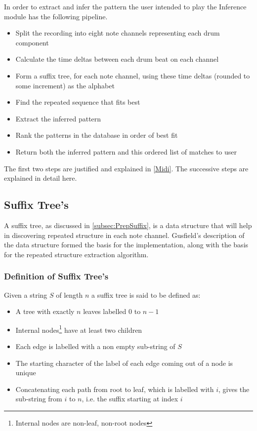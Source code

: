 \documentclass[12pt,twoside,notitlepage]{report}
\begin{document}
	In order to extract and infer the pattern the user intended to play the Inference module has the following pipeline.

	\begin{itemize}
		\item{Split the recording into eight note channels representing each drum component}
		\item{Calculate the time deltas between each drum beat on each channel}
		\item{Form a suffix tree, for each note channel, using these time deltas (rounded to some increment) as the alphabet}
		\item{Find the repeated sequence that fits best}
		\item{Extract the inferred pattern}
		\item{Rank the patterns in the database in order of best fit}
		\item{Return both the inferred pattern and this ordered list of matches to user}
	\end{itemize}
	
	The first two steps are justified and explained in \ref{Midi}. The successive steps are explained in detail here.
		\subsection{\label{subsec:SuffixTree}Suffix Tree's}
		A suffix tree, as discussed in \ref{subsec:PrepSuffix}, is a data structure that will help in discovering repeated structure in each note channel. Gusfield's\cite{Gusfield1999} description of the data structure formed the basis for the implementation, along with the basis for the repeated structure extraction algorithm.
		
			\subsubsection{Definition of Suffix Tree's}
			Given a string $S$ of length $n$ a suffix tree is said to be defined as:
			\begin{itemize}
				\item{A tree with exactly $n$ leaves labelled $0$ to $n-1$}
				\item{Internal nodes\footnote{Internal nodes are non-leaf, non-root nodes} have at least two children}
				\item{Each edge is labelled with a non empty sub-string of $S$}
				\item{The starting character of the label of each edge coming out of a node is unique}
				\item{Concatenating each path from root to leaf, which is labelled with $i$, gives the sub-string from $i$ to $n$, i.e. the suffix starting at index $i$}
\end{itemize}
			
\end{document}
